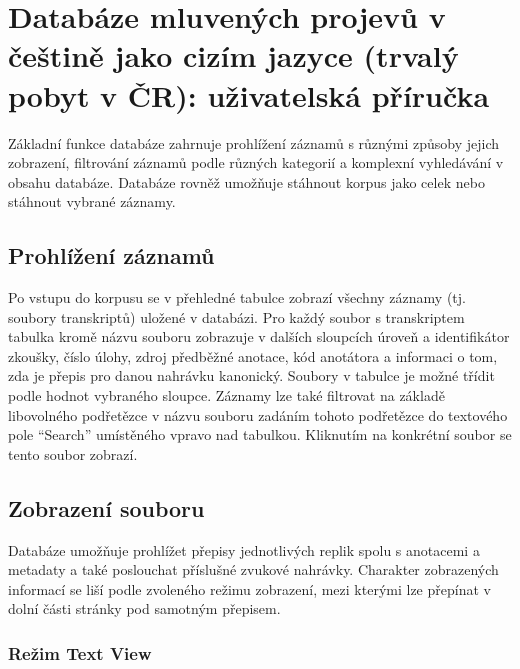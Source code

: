 \documentclass[
]{article}
\author{}
\date{}
\begin{document}
\hypertarget{databuxe1ze-mluvenuxfdch-projevux16f-v-ux10deux161tinux11b-jako-cizuxedm-jazyce-trvaluxfd-pobyt-v-ux10dr-uux17eivatelskuxe1-pux159uxedruux10dka}{%
\section{Databáze mluvených projevů v češtině jako cizím jazyce (trvalý
pobyt v ČR): uživatelská
příručka}\label{databuxe1ze-mluvenuxfdch-projevux16f-v-ux10deux161tinux11b-jako-cizuxedm-jazyce-trvaluxfd-pobyt-v-ux10dr-uux17eivatelskuxe1-pux159uxedruux10dka}}

Základní funkce databáze zahrnuje prohlížení záznamů s různými způsoby
jejich zobrazení, filtrování záznamů podle různých kategorií a komplexní
vyhledávání v obsahu databáze. Databáze rovněž umožňuje stáhnout korpus
jako celek nebo stáhnout vybrané záznamy.

\hypertarget{prohluxedux17eenuxed-zuxe1znamux16f}{%
\subsection{Prohlížení
záznamů}\label{prohluxedux17eenuxed-zuxe1znamux16f}}

Po vstupu do korpusu se v přehledné tabulce zobrazí všechny záznamy (tj.
soubory transkriptů) uložené v databázi. Pro každý soubor s transkriptem
tabulka kromě názvu souboru zobrazuje v dalších sloupcích úroveň a
identifikátor zkoušky, číslo úlohy, zdroj předběžné anotace, kód
anotátora a informaci o tom, zda je přepis pro danou nahrávku kanonický.
Soubory v tabulce je možné třídit podle hodnot vybraného sloupce.
Záznamy lze také filtrovat na základě libovolného podřetězce v názvu
souboru zadáním tohoto podřetězce do textového pole ``Search''
umístěného vpravo nad tabulkou. Kliknutím na konkrétní soubor se tento
soubor zobrazí.

\hypertarget{zobrazenuxed-souboru}{%
\subsection{Zobrazení souboru}\label{zobrazenuxed-souboru}}

Databáze umožňuje prohlížet přepisy jednotlivých replik spolu s
anotacemi a metadaty a také poslouchat příslušné zvukové nahrávky.
Charakter zobrazených informací se liší podle zvoleného režimu
zobrazení, mezi kterými lze přepínat v dolní části stránky pod samotným
přepisem.

\hypertarget{reux17eim-text-view}{%
\subsubsection{Režim Text View}\label{reux17eim-text-view}}
\end{document}
